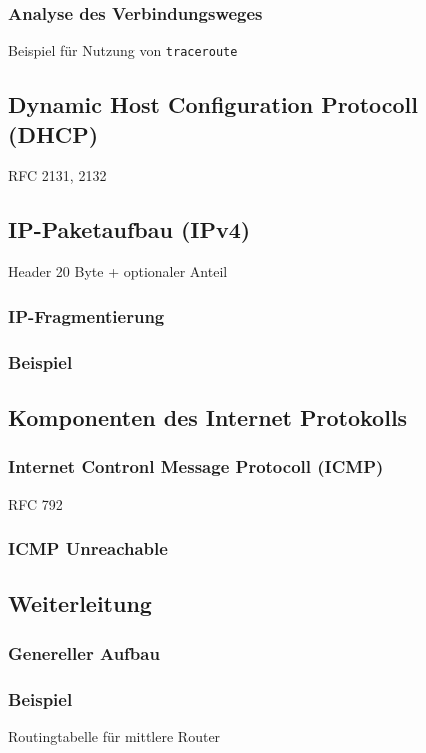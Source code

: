\subsubsection{Analyse des Verbindungsweges}
Beispiel für Nutzung von \lstinline|traceroute|
\subsection{Dynamic Host Configuration Protocoll (DHCP)}
RFC 2131, 2132
\subsection{IP-Paketaufbau (IPv4)}
Header 20 Byte + optionaler Anteil
\subsubsection{IP-Fragmentierung}
\subsubsection*{Beispiel}

\subsection{Komponenten des Internet Protokolls}

\subsubsection{Internet Contronl Message Protocoll (ICMP)}
RFC 792
\subsubsection*{ICMP Unreachable}

\subsection{Weiterleitung}
\subsubsection*{Genereller Aufbau}
\subsubsection*{Beispiel}
Routingtabelle für mittlere Router
